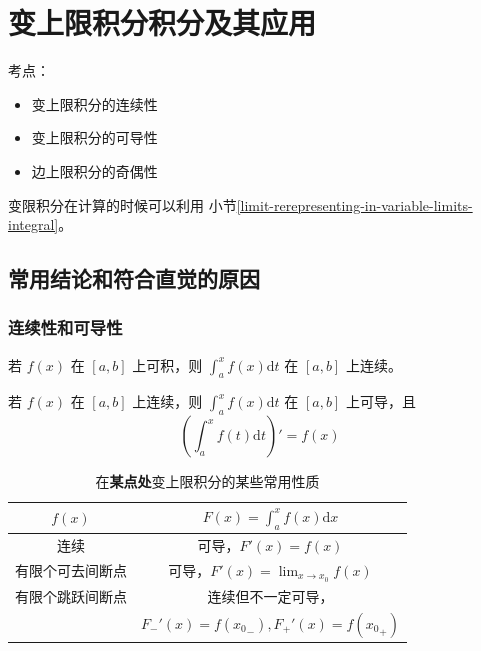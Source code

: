 \section{变上限积分积分及其应用}

考点：
\begin{itemize}
    \item 变上限积分的连续性
    \item 变上限积分的可导性
    \item 边上限积分的奇偶性
\end{itemize}

变限积分在计算的时候可以利用 小节\ref{limit-rerepresenting-in-variable-limits-integral}。

\subsection{常用结论和符合直觉的原因}

\subsubsection{连续性和可导性}

\begin{theorem}
    若 $f(x)$ 在 $[a, b]$ 上可积，则 $\int_a^x f(x) \mathrm{d} t$
    在 $[a, b]$ 上连续。
\end{theorem}

\begin{theorem}
    \label{thm:derivative-of-variadict-integral}
    若 $f(x)$ 在 $[a, b]$ 上连续，则 $\int_a^x f(x) \mathrm{d} t$
    在 $[a, b]$ 上可导，且
    \[
        \left(\int_a^x f(t) \mathrm{d}t\right)' = f(x)
    \]
\end{theorem}

\begin{table}
    \centering
    \begin{tabular}{cc}
        \toprule
        $f(x)$ & $F(x) = \int_a^x f(x) \mathrm{d}x$ \\
        \midrule
        连续             & 可导，$F'(x) = f(x)$ \\
        有限个可去间断点 & 可导，$F'(x) = \lim_{x \to x_0} f(x)$\\
        有限个跳跃间断点 & 连续但不一定可导，\\
        {}&$F_{-}'(x) = f({x_0}_{-}), F_{+}'(x) = f({x_0}_{+})$ \\
        \bottomrule
    \end{tabular}
    \caption{在\textbf{某点处}变上限积分的某些常用性质}
    \label{tab:useful-properoties-of-variable-limits-integral}
\end{table}


